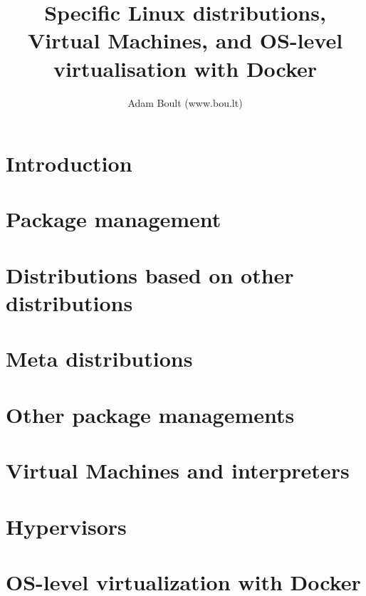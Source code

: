 \documentclass[oneside]{book}
\begin{document}
\author{Adam Boult (www.bou.lt)}
\title{Specific Linux distributions, Virtual Machines, and OS-level virtualisation with Docker}
\maketitle

\setcounter{tocdepth}{0}
\tableofcontents



\part{Introduction}


\part{Package management}











\part{Distributions based on other distributions}


\part{Meta distributions}


\part{Other package managements}



\part{Virtual Machines and interpreters}

\part{Hypervisors}

\part{OS-level virtualization with Docker}

\end{document}
